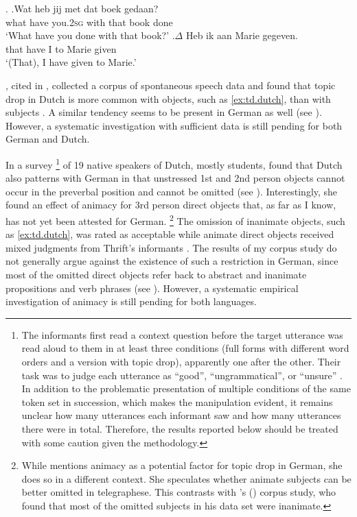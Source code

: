 \ex.\label{ex:td.dutch}
\ag.Wat heb jij met dat boek gedaan?\\
what have you.\textsc{2sg} with that book done\\
`What have you done with that book?'
\bg.$\Delta$ Heb ik aan Marie gegeven.\\
that have I to Marie given\\
`(That), I have given to Marie.' \citep[63]{thrift2001}

\noindent
\citet{jansen1981}, cited in \citet{thrift2001}, collected a corpus  of spontaneous speech data and found that topic drop in Dutch is more common with objects, such as \ref{ex:td.dutch}, than with subjects \citep[58]{thrift2001}. 
A similar tendency seems to be present in German as well (see ).
However, a systematic investigation with sufficient data is still pending for both German and Dutch.

In a survey%
\footnote{The informants first read a context question before the target utterance was read aloud to them in at least three conditions (full forms with different word orders and a version with topic drop), apparently one after the other. 
Their task was to judge each utterance as ``good'', ``ungrammatical'', or ``unsure'' \citep[59]{thrift2001}.
In addition to the problematic presentation of multiple conditions of the same token set in succession, which makes the manipulation evident, it remains unclear how many utterances each informant saw and how many utterances there were in total.
Therefore, the results reported below should be treated with some caution given the methodology.}
%
of 19 native speakers of Dutch, mostly students, \citet[62]{thrift2001} found that Dutch also patterns with German in that unstressed 1st and 2nd person objects cannot occur in the preverbal position and cannot be omitted (see ).
Interestingly, she found an effect of animacy  for 3rd person direct objects that, as far as I know, has not yet been attested for German.%
\footnote{While \citet[190]{reis1982} mentions animacy  as a potential factor for topic drop in German, she does so in a different context.
She speculates whether animate subjects can be better omitted in telegraphese.
This contrasts with \citeauthor{poitou1993}'s (\citeyear[116]{poitou1993}) corpus study,  who found that most of the omitted subjects in his data set were inanimate.
}
The omission of inanimate objects, such as \ref{ex:td.dutch}, was rated as acceptable while animate direct objects received mixed judgments from  Thrift's informants \citep[63--64]{thrift2001}. 
The results of my corpus study  do not generally argue against the existence of such a restriction in German, since most of the omitted direct objects refer back to abstract and inanimate propositions and verb phrases  (see ).
However, a systematic empirical investigation of animacy  is still pending for both languages.


